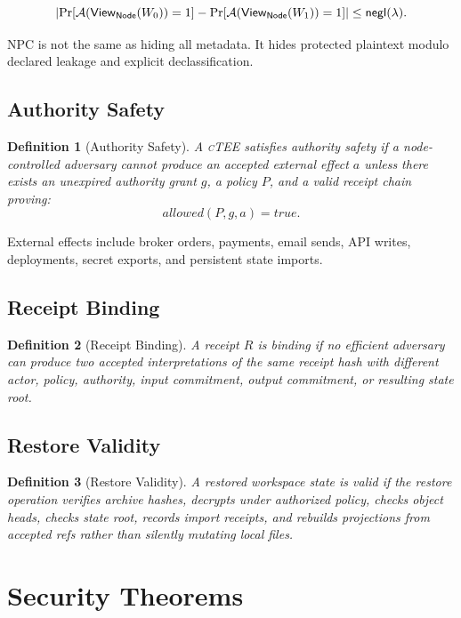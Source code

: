 \documentclass[11pt]{article}
\newtheorem{definition}{Definition}
\newcommand{\ctee}{\textnormal{\textsc{cTEE}}}
\newcommand{\roletext}[1]{\textnormal{\textsc{#1}}\xspace}
\newcommand{\node}{\ifmmode\mathsf{Node}\else\roletext{Node}\fi}
\newcommand{\view}{\mathsf{View}}
\newcommand{\adv}{\mathcal{A}}
\newcommand{\negl}{\mathsf{negl}}
\begin{document}
\[
\left|
\Pr[\adv(\view_{\node}(W_0))=1] -
\Pr[\adv(\view_{\node}(W_1))=1]
\right| \leq \negl(\lambda).
\]

NPC is not the same as hiding all metadata. It hides protected plaintext modulo
declared leakage and explicit declassification.

\subsection{Authority Safety}

\begin{definition}[Authority Safety]
A \ctee{} satisfies authority safety if a node-controlled adversary cannot
produce an accepted external effect \(a\) unless there exists an unexpired
authority grant \(g\), a policy \(P\), and a valid receipt chain proving:
\[
allowed(P,g,a) = true.
\]
\end{definition}

External effects include broker orders, payments, email sends, API writes,
deployments, secret exports, and persistent state imports.

\subsection{Receipt Binding}

\begin{definition}[Receipt Binding]
A receipt \(R\) is binding if no efficient adversary can produce two accepted
interpretations of the same receipt hash with different actor, policy,
authority, input commitment, output commitment, or resulting state root.
\end{definition}

\subsection{Restore Validity}

\begin{definition}[Restore Validity]
A restored workspace state is valid if the restore operation verifies archive
hashes, decrypts under authorized policy, checks object heads, checks state
root, records import receipts, and rebuilds projections from accepted refs
rather than silently mutating local files.
\end{definition}

\section{Security Theorems}
\end{document}
